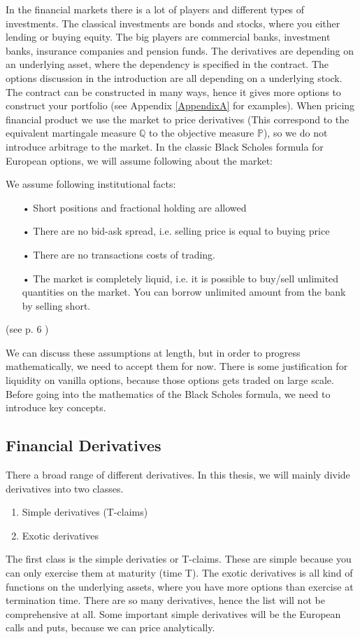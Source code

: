 In the financial markets there is a lot of players and different types of investments. The classical investments are bonds and stocks, where you either lending or buying equity. The big players are commercial banks, investment banks, insurance companies and pension funds. The derivatives are depending on an underlying asset, where the dependency is specified in the contract. The options discussion in the introduction are all depending on a underlying stock. The contract can be constructed in many ways, hence it gives more options to construct your portfolio (see Appendix \ref{AppendixA} for examples). When pricing financial product we use the market to price derivatives (This correspond to the equivalent martingale measure $\mathbb{Q}$ to the objective measure $\mathbb{P}$), so we do not introduce arbitrage to the market. In the classic Black Scholes formula for European options, we will assume following about the market:
\theoremstyle{assumption}
\begin{assumption}{}\label{EfficientMarket}
We assume following institutional facts:
\begin{enumerate}
\item[•] Short positions and fractional holding are allowed 
\item[•] There are no bid-ask spread, i.e. selling price is equal to buying price
\item[•] There are no transactions costs of trading.
\item[•] The market is completely liquid, i.e. it is possible to buy/sell unlimited quantities on the market. You can borrow unlimited amount from the bank by selling short.
\end{enumerate}
(see p. 6 \parencite{finKont})
\end{assumption}
We can discuss these assumptions at length, but in order to progress mathematically, we need to accept them for now. There is some justification for liquidity on vanilla options, because those options gets traded on large scale. Before going into the mathematics of the Black Scholes formula, we need to introduce key concepts.

\subsection{Financial Derivatives}
There a broad range of different derivatives. In this thesis, we will mainly divide derivatives into two classes. 
\begin{enumerate}
\item Simple derivatives (T-claims)
\item Exotic derivatives
\end{enumerate}
The first class is the simple derivaties or T-claims. These are simple because you can only exercise them at maturity (time T). The exotic derivatives is all kind of functions on the underlying assets, where you have more options than exercise at termination time. There are so many derivatives, hence the list will not be comprehensive at all. Some important simple derivatives will be the European calls and puts, because we can price analytically.

